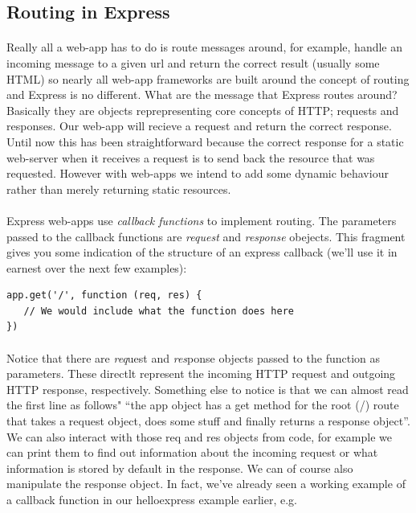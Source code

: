 \documentclass[10pt, a4paper, twosize]{article}
\begin{document}
\subsection{Routing in Express}
\paragraph{} Really all a web-app has to do is route messages around, for example, handle an incoming message to a given url and return the correct result (usually some HTML) so nearly all web-app frameworks are built around the concept of routing and Express is no different. What are the message that Express routes around? Basically they are objects reprepresenting core concepts of HTTP; requests and responses. Our web-app will recieve a request and return the correct response. Until now this has been straightforward because the correct response for a static web-server when it receives a request is to send back the resource that was requested. However with web-apps we intend to add some dynamic behaviour rather than merely returning static resources.

\paragraph{} Express web-apps use \emph{callback functions} to implement routing. The parameters passed to the callback functions are \emph{request} and \emph{response} obejects. This fragment gives you some indication of the structure of an express callback (we'll use it in earnest over the next few examples):

\begin{lstlisting}
app.get('/', function (req, res) {
   // We would include what the function does here
})
\end{lstlisting}

\paragraph{} Notice that there are \emph{req}uest and \emph{res}ponse objects passed to the function as parameters. These directlt represent the incoming HTTP request and outgoing HTTP response, respectively. Something else to notice is that we can almost read the first line as follows" ``the app object has a get method for the root (/) route that takes a request object, does some stuff and finally returns a response object''. We can also interact with those req and res objects from code, for example we can print them to find out information about the incoming request or what information is stored by default in the response. We can of course also manipulate the response object. In fact, we've already seen a working example of a callback function in our helloexpress example earlier, e.g.
\end{document}
